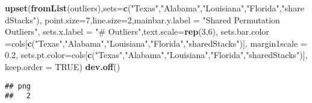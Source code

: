 \documentclass[11pt,]{article}
\newenvironment{Shaded}{\begin{snugshade}}{\end{snugshade}}
\newcommand{\KeywordTok}[1]{\textcolor[rgb]{0.13,0.29,0.53}{\textbf{#1}}}
\newcommand{\DataTypeTok}[1]{\textcolor[rgb]{0.13,0.29,0.53}{#1}}
\newcommand{\DecValTok}[1]{\textcolor[rgb]{0.00,0.00,0.81}{#1}}
\newcommand{\FloatTok}[1]{\textcolor[rgb]{0.00,0.00,0.81}{#1}}
\newcommand{\StringTok}[1]{\textcolor[rgb]{0.31,0.60,0.02}{#1}}
\newcommand{\OtherTok}[1]{\textcolor[rgb]{0.56,0.35,0.01}{#1}}
\newcommand{\NormalTok}[1]{#1}
\begin{document}
\begin{Shaded}
\begin{Highlighting}[]
\KeywordTok{upset}\NormalTok{(}\KeywordTok{fromList}\NormalTok{(outliers),}\DataTypeTok{sets=}\KeywordTok{c}\NormalTok{(}\StringTok{"Texas"}\NormalTok{,}\StringTok{"Alabama"}\NormalTok{,}\StringTok{"Louisiana"}\NormalTok{,}\StringTok{"Florida"}\NormalTok{,}\StringTok{"sharedStacks"}\NormalTok{),}
      \DataTypeTok{point.size=}\DecValTok{7}\NormalTok{,}\DataTypeTok{line.size=}\DecValTok{2}\NormalTok{,}\DataTypeTok{mainbar.y.label =} \StringTok{"Shared Permutation Outliers"}\NormalTok{,}
      \DataTypeTok{sets.x.label =} \StringTok{"# Outliers"}\NormalTok{,}\DataTypeTok{text.scale=}\KeywordTok{rep}\NormalTok{(}\DecValTok{3}\NormalTok{,}\DecValTok{6}\NormalTok{),}
      \DataTypeTok{sets.bar.color =}\NormalTok{cols[}\KeywordTok{c}\NormalTok{(}\StringTok{"Texas"}\NormalTok{,}\StringTok{"Alabama"}\NormalTok{,}\StringTok{"Louisiana"}\NormalTok{,}\StringTok{"Florida"}\NormalTok{,}\StringTok{"sharedStacks"}\NormalTok{)],}
      \DataTypeTok{margin1scale =} \FloatTok{0.2}\NormalTok{,}
      \DataTypeTok{sets.pt.color=}\NormalTok{cols[}\KeywordTok{c}\NormalTok{(}\StringTok{"Texas"}\NormalTok{,}\StringTok{"Alabama"}\NormalTok{,}\StringTok{"Louisiana"}\NormalTok{,}\StringTok{"Florida"}\NormalTok{,}\StringTok{"sharedStacks"}\NormalTok{)],}
      \DataTypeTok{keep.order =} \OtherTok{TRUE}\NormalTok{)}
\KeywordTok{dev.off}\NormalTok{()}
\end{Highlighting}
\end{Shaded}

\begin{verbatim}
## png 
##   2
\end{verbatim}
\end{document}
